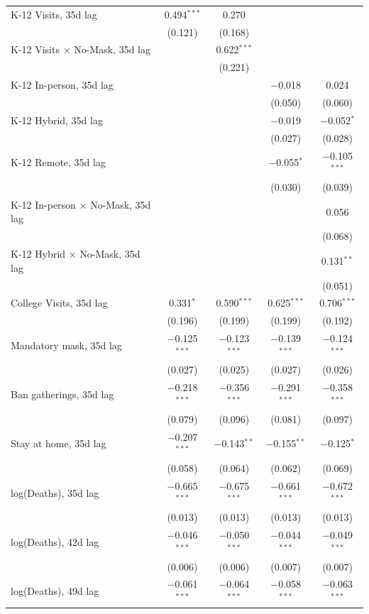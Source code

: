 \documentclass[9pt,twoside,lineno]{pnas-new}
\theoremstyle{definition}
\begin{document}
\begin{table}[!htbp]
{\begin{tabular}{@{\extracolsep{1pt}}lcc|cc}
 K-12 Visits,  35d lag  & 0.494$^{***}$ & 0.270 &  &  \\ 
  & (0.121) & (0.168) &  &  \\ 
 K-12 Visits $\times$ No-Mask,  35d lag  &  & 0.622$^{***}$ &  &  \\ 
  &  & (0.221) &  &  \\ 
 K-12 In-person,  35d lag  &  &  & $-$0.018 & 0.024 \\ 
  &  &  & (0.050) & (0.060) \\ 
K-12 Hybrid,  35d lag &  &  & $-$0.019 & $-$0.052$^{*}$ \\ 
  &  &  & (0.027) & (0.028) \\ 
 K-12 Remote,  35d lag&  &  & $-$0.055$^{*}$ & $-$0.105$^{***}$ \\ 
  &  &  & (0.030) & (0.039) \\ 
  K-12 In-person $\times$ No-Mask,  35d lag&  &  &  & 0.056 \\ 
  &  &  &  & (0.068) \\ 
 K-12 Hybrid $\times$ No-Mask,  35d lag &  &  &  & 0.131$^{**}$ \\ 
  &  &  &  & (0.051) \\ \hline
College Visits, 35d lag  & 0.331$^{*}$ & 0.590$^{***}$ & 0.625$^{***}$ & 0.706$^{***}$ \\ 
  & (0.196) & (0.199) & (0.199) & (0.192) \\ 
Mandatory mask,   35d lag  & $-$0.125$^{***}$ & $-$0.123$^{***}$ & $-$0.139$^{***}$ & $-$0.124$^{***}$ \\ 
  & (0.027) & (0.025) & (0.027) & (0.026) \\ 
 Ban gatherings,  35d lag & $-$0.218$^{***}$ & $-$0.356$^{***}$ & $-$0.291$^{***}$ & $-$0.358$^{***}$ \\ 
  & (0.079) & (0.096) & (0.081) & (0.097) \\ 
  Stay at home,   35d lag & $-$0.207$^{***}$ & $-$0.143$^{**}$ & $-$0.155$^{**}$ & $-$0.125$^{*}$ \\ 
  & (0.058) & (0.064) & (0.062) & (0.069) \\ \hline
  log(Deaths), 35d lag& $-$0.665$^{***}$ & $-$0.675$^{***}$ & $-$0.661$^{***}$ & $-$0.672$^{***}$ \\ 
  & (0.013) & (0.013) & (0.013) & (0.013) \\ 
 log(Deaths), 42d lag& $-$0.046$^{***}$ & $-$0.050$^{***}$ & $-$0.044$^{***}$ & $-$0.049$^{***}$ \\ 
  & (0.006) & (0.006) & (0.007) & (0.007) \\ 
   log(Deaths), 49d lag  & $-$0.061$^{***}$ & $-$0.064$^{***}$ & $-$0.058$^{***}$ & $-$0.063$^{***}$ \\ 

\end{tabular}}
\end{table}
\end{document}
